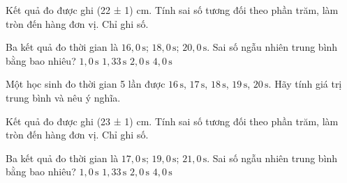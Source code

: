 \begin{ex}
Kết quả đo được ghi (22 ± 1) cm. Tính sai số tương đối theo phần trăm, làm tròn đến hàng đơn vị. Chỉ ghi số.
\end{ex}

\begin{ex}
Ba kết quả đo thời gian là $16,0\,\text{s}$; $18,0\,\text{s}$; $20,0\,\text{s}$. Sai số ngẫu nhiên trung bình bằng bao nhiêu?
\choice
{$1,0\,\text{s}$}
{\True $1,33\,\text{s}$}
{$2,0\,\text{s}$}
{$4,0\,\text{s}$}
\end{ex}


\begin{bt}
Một học sinh đo thời gian 5 lần được $16\,\text{s}$, $17\,\text{s}$, $18\,\text{s}$, $19\,\text{s}$, $20\,\text{s}$. Hãy tính giá trị trung bình và nêu ý nghĩa.
\end{bt}

\begin{ex}
Kết quả đo được ghi (23 ± 1) cm. Tính sai số tương đối theo phần trăm, làm tròn đến hàng đơn vị. Chỉ ghi số.
\end{ex}

\begin{ex}
Ba kết quả đo thời gian là $17,0\,\text{s}$; $19,0\,\text{s}$; $21,0\,\text{s}$. Sai số ngẫu nhiên trung bình bằng bao nhiêu?
\choice
{$1,0\,\text{s}$}
{\True $1,33\,\text{s}$}
{$2,0\,\text{s}$}
{$4,0\,\text{s}$}
\end{ex}


